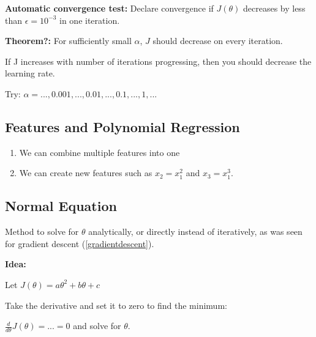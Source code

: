 \documentclass{article}
\begin{document}
\textbf{Automatic convergence test:} Declare convergence if $J(\theta)$ decreases by less than $\epsilon = 10^{-3}$ in one iteration.

\hspace{}

\begin{myboxb}
\textbf{Theorem?:} For sufficiently small $\alpha$, $J$ should decrease on every iteration.

If J increases with number of iterations progressing, then you should decrease the learning rate.


Try: $\alpha = ..., 0.001, ... , 0.01, ... , 0.1, ...,  1, ...$
\end{myboxb}


\subsection{Features and Polynomial Regression}

\begin{enumerate}
    \item We can combine multiple features into one
    \item We can create new features such as $x_2 = x_1^2$ and $x_3 = x_1^3$.
\end{enumerate}



\subsection{Normal Equation}

Method to solve for $\theta$ analytically, or directly instead of iteratively, as was seen for gradient descent (\ref{gradientdescent}).


\begin{mybox}
    \textbf{Idea:}
    
    Let $J(\theta) = a\theta^2 + b \theta + c$
    
    Take the derivative and set it to zero to find the minimum: 
    
    $\frac{d}{d\theta} J(\theta) = ... = 0$ and solve for $\theta$.
\end{mybox}
\end{document}
